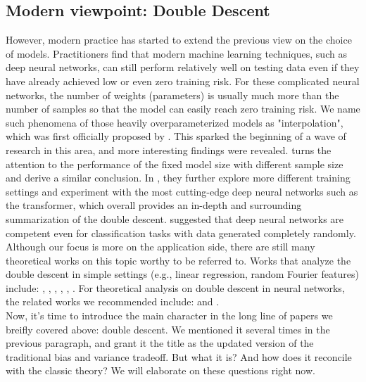 \documentclass{article}
\begin{document}
\vspace{-2mm}
\subsection{Modern viewpoint: Double Descent} \label{modern}
\vspace{-1mm}
However, modern practice has started to extend the previous view on the choice of models. Practitioners find that modern machine learning techniques, such as deep neural networks, can still perform relatively well on testing data even if they have already achieved low or even zero training risk. For these complicated neural networks, the number of weights (parameters) is usually much more than the number of samples so that the model can easily reach zero training risk. We name such phenomena of those heavily overparameterized models as "interpolation", which was first officially proposed by \cite{belkin2019reconciling}. This sparked the beginning of a wave of research in this area, and more interesting findings were revealed. \cite{nakkiran2019more} turns the attention to the performance of the fixed model size with different sample size and derive a similar conclusion. In \cite{nakkiran2021deep}, they further explore more different training settings and experiment with the most cutting-edge deep neural networks such as the transformer, which overall provides an in-depth and surrounding summarization of the double descent. \cite{zhang2021understanding} suggested that deep neural networks are competent even for classification tasks with data generated completely randomly. Although our focus is more on the application side, there are still many theoretical works on this topic worthy to be referred to. Works that analyze the double descent in simple settings (e.g., linear regression, random Fourier features) include: \cite{Bartlett_Long_Lugosi_Tsigler_2019}, \cite{Muthukumar_Vodrahalli_Subramanian_Sahai_2019}, \cite{Mitra_2019}, \cite{Derezinski_Liang_Mahoney_2019}, \cite{Liang_Rakhlin_2020}, \cite{Mei_Montanari_2022}. For theoretical analysis on double descent in neural networks, the related works we recommended include: \cite{d2020double} and \cite{baldassi2021unveiling}.\\

\vspace{-3mm}
Now, it's time to introduce the main character in the long line of papers we breifly covered above: double descent. We mentioned it several times in the previous paragraph, and grant it the title as the updated version of the traditional bias and variance tradeoff. But what it is? And how does it reconcile with the classic theory? We will elaborate on these questions right now.\\
\end{document}
